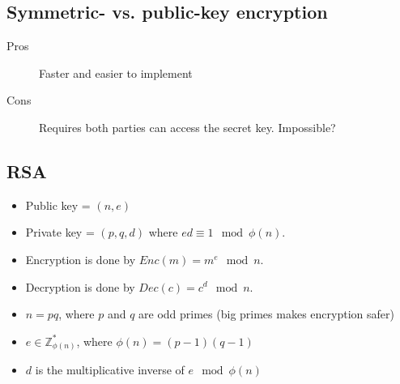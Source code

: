 \subsection{Symmetric- vs. public-key encryption}
\begin{description}
\item[Pros] Faster and easier to implement
\item[Cons] Requires both parties can access the secret key. Impossible?
\end{description}

\subsection*{RSA}
\begin{itemize}
\item Public key = $(n,e)$
\item Private key = $(p,q,d)$ where $ed \equiv 1 \mod \phi(n)$.
\item Encryption is done by $Enc(m)= m^e \mod n$.
\item Decryption is done by $Dec(c)=c^d \mod n$.
\item $n = pq$, where $p$ and $q$ are odd primes (big primes makes encryption safer)
\item $e \in \mathbb{Z}^*_{\phi (n)}$, where $\phi (n)=(p-1)(q-1)$
\item $d$ is the multiplicative inverse of $e \mod \phi(n)$
\end{itemize}

